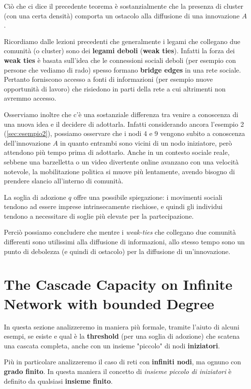 Ciò che ci dice il precedente teorema è sostanzialmente che la presenza di cluster (con una certa densità) comporta un ostacolo alla diffusione di una innovazione $A$.

Ricordiamo dalle lezioni precedenti che generalmente i legami che collegano due comunità (o cluster) sono dei \textbf{legami deboli} (\textbf{weak ties}).
Infatti la forza dei \textbf{weak ties} è basata sull'idea che le connessioni sociali deboli (per esempio con persone che vediamo di rado) spesso formano \textbf{bridge edges} in una rete sociale.
Pertanto forniscono accesso a fonti di informazioni (per esempio nuove opportunità di lavoro) che risiedono in parti della rete a cui altrimenti non avremmo accesso.

Osserviamo inoltre che c'è una sostanziale differenza tra venire a conoscenza di una nuova idea e il decidere di adottarla.
Infatti considerando ancora l'esempio 2 (\autoref{sec:esempio2}), possiamo osservare che i nodi 4 e 9 vengono subito a conoscenza dell'innovazione $A$ in quanto entrambi sono vicini di un nodo iniziatore, però attendono più tempo prima di adottarlo.
Anche in un contesto sociale reale, sebbene una barzelletta o un video divertente online avanzano con una velocità notevole, la mobilitazione politica si muove più lentamente, avendo bisogno di prendere slancio all'interno di comunità.

La soglia di adozione $q$ offre una possibile spiegazione:
i movimenti sociali tendono ad essere imprese intrinsecamente rischiose, e quindi gli individui tendono a necessitare di soglie più elevate per la partecipazione.

Perciò possiamo concludere che mentre i \textit{weak-ties} che collegano due comunità differenti sono utilissimi alla diffusione di informazioni, allo stesso tempo sono un punto di debolezza (e quindi di ostacolo) per la diffusione di un'innovazione.

\newpage
\section{The Cascade Capacity on Infinite Network with bounded Degree}

In questa sezione analizzeremo in maniera più formale, tramite l'aiuto di alcuni esempi, se esiste e qual è la \textbf{threshold} (per una soglia di adozione) che scatena una cascata completa, anche con un insieme "piccolo" di nodi \textbf{iniziatori}.

Più in particolare analizzeremo il caso di reti con \textbf{infiniti nodi}, ma ognuno con \textbf{grado finito}. In questa maniera il concetto di \textit{insieme piccolo di iniziatori} è definito da qualsiasi \textbf{insieme finito}.


